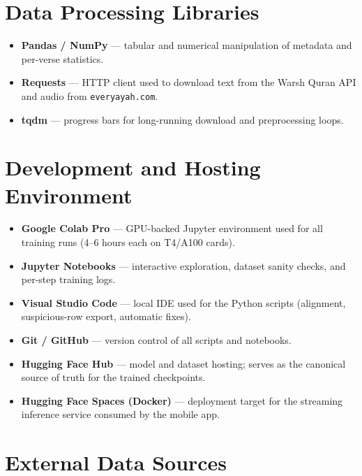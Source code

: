 \section{Data Processing Libraries}

\begin{itemize}[leftmargin=2em]
  \item \textbf{Pandas / NumPy} --- tabular and numerical manipulation
        of metadata and per-verse statistics.
  \item \textbf{Requests} --- HTTP client used to download text from the
        Warsh Quran API and audio from \texttt{everyayah.com}.
  \item \textbf{tqdm} --- progress bars for long-running download and
        preprocessing loops.
\end{itemize}

\section{Development and Hosting Environment}

\begin{itemize}[leftmargin=2em]
  \item \textbf{Google Colab Pro} --- GPU-backed Jupyter environment used
        for all training runs (4--6 hours each on T4/A100 cards).
  \item \textbf{Jupyter Notebooks} --- interactive exploration, dataset
        sanity checks, and per-step training logs.
  \item \textbf{Visual Studio Code} --- local IDE used for the Python
        scripts (alignment, suspicious-row export, automatic fixes).
  \item \textbf{Git / GitHub} --- version control of all scripts and
        notebooks.
  \item \textbf{Hugging Face Hub} --- model and dataset hosting; serves as
        the canonical source of truth for the trained checkpoints.
  \item \textbf{Hugging Face Spaces (Docker)} --- deployment target for
        the streaming inference service consumed by the mobile app.
\end{itemize}

\section{External Data Sources}

